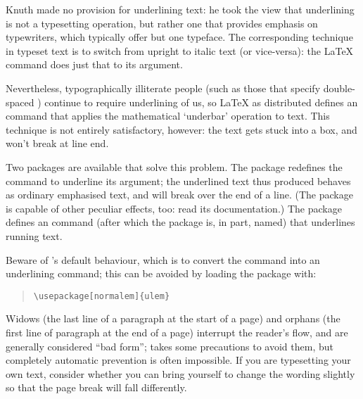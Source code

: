 
Knuth made no provision for underlining text: he took the view that
underlining is not a typesetting operation, but rather one that
provides emphasis on typewriters, which typically offer but one
typeface.  The corresponding technique in typeset text is to switch
from upright to italic text (or vice-versa): the \LaTeX{} command
 does just that to its argument.

Nevertheless, typographically illiterate people (such as those that
specify double-spaced
)
continue to require underlining of us, so \LaTeX{} as distributed
defines an  command that applies the mathematical
`underbar' operation to text.  This technique is not entirely
satisfactory, however: the text gets stuck into a box, and won't break
at line end.

Two packages are available that solve this problem.  The
 package redefines the
 command to underline its argument; the underlined text thus
produced behaves as ordinary emphasised text, and will break over the
end of a line.  (The package is capable of other peculiar effects,
too: read its documentation.)
The  package defines an  command (after which the
package is, in part, named) that underlines running text.

Beware of 's default behaviour, which is to convert the
 command into an underlining command; this can be avoided by
loading the package with:
\begin{quote}
\begin{verbatim}
\usepackage[normalem]{ulem}
\end{verbatim}
\end{quote}
\begin{ctanrefs}
\item[ulem.sty]
\item[soul.sty]
\end{ctanrefs}


Widows (the last line of a paragraph at the start of a page) and
orphans (the first line of paragraph at the end of a page) interrupt
the reader's flow, and are generally considered ``bad form'';
\AllTeX{} takes some precautions to avoid them, but completely
automatic prevention is often impossible.  If you are typesetting your
own text, consider whether you can bring yourself to change the
wording slightly so that the page break will fall differently.

